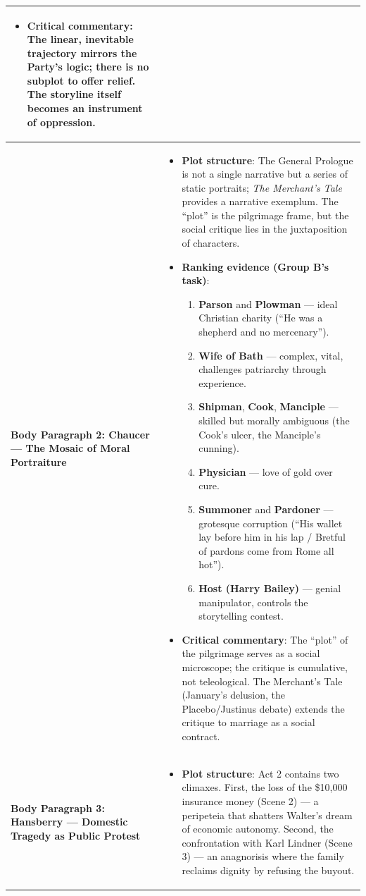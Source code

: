 \documentclass[11pt]{article}
\begin{document}
\begin{exemplebox}
\begin{center}
\begin{tabularx}{\linewidth}{|l|X|}
\begin{itemize}
\begin{enumerate}
    \end{enumerate}
    \item \textbf{Critical commentary}: The linear, inevitable trajectory mirrors the Party's logic; there is no subplot to offer relief. The storyline itself becomes an instrument of oppression.
\end{itemize} \\
\hline
\textbf{Body Paragraph 2: Chaucer — The Mosaic of Moral Portraiture} & 
\begin{itemize}
    \item \textbf{Plot structure}: The General Prologue is not a single narrative but a series of static portraits; \emph{The Merchant's Tale} provides a narrative exemplum. The ``plot'' is the pilgrimage frame, but the social critique lies in the juxtaposition of characters.
    \item \textbf{Ranking evidence (Group B's task)}: 
    \begin{enumerate}
        \item \textbf{Parson} and \textbf{Plowman} — ideal Christian charity (``He was a shepherd and no mercenary'').
        \item \textbf{Wife of Bath} — complex, vital, challenges patriarchy through experience.
        \item \textbf{Shipman}, \textbf{Cook}, \textbf{Manciple} — skilled but morally ambiguous (the Cook's ulcer, the Manciple's cunning).
        \item \textbf{Physician} — love of gold over cure.
        \item \textbf{Summoner} and \textbf{Pardoner} — grotesque corruption (``His wallet lay before him in his lap / Bretful of pardons come from Rome all hot'').
        \item \textbf{Host (Harry Bailey)} — genial manipulator, controls the storytelling contest.
    \end{enumerate}
    \item \textbf{Critical commentary}: The ``plot'' of the pilgrimage serves as a social microscope; the critique is cumulative, not teleological. The Merchant's Tale (January's delusion, the Placebo/Justinus debate) extends the critique to marriage as a social contract.
\end{itemize} \\
\hline
\textbf{Body Paragraph 3: Hansberry — Domestic Tragedy as Public Protest} & 
\begin{itemize}
    \item \textbf{Plot structure}: Act 2 contains two climaxes. First, the loss of the \$10,000 insurance money (Scene 2) — a peripeteia that shatters Walter's dream of economic autonomy. Second, the confrontation with Karl Lindner (Scene 3) — an anagnorisis where the family reclaims dignity by refusing the buyout.

\end{itemize}
\end{tabularx}
\end{center}
\end{exemplebox}
\end{document}
